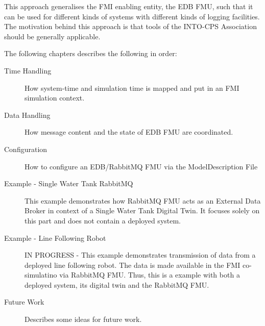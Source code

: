 This approach generalises the FMI enabling entity, the EDB FMU, such that
it can be used for different kinds of systems with different kinds of logging
facilities. The motivation behind this approach is that tools of the INTO-CPS Association
should be generally applicable.

The following chapters describes the following in order:
\begin{description}
  \item[Time Handling] How system-time and simulation time is mapped and put in
    an FMI simulation context.
  \item[Data Handling] How message content and the state of EDB FMU are
    coordinated.
  \item[Configuration] How to configure an EDB/RabbitMQ FMU via the ModelDescription File
  \item[Example - Single Water Tank RabbitMQ] This example demonstrates how RabbitMQ FMU
    acts as an External Data Broker in context of a Single Water Tank Digital Twin. It focuses solely on this part and does not
    contain a deployed system.

    \item[Example - Line Following Robot] IN PROGRESS - This example demonstrates transmission
    of data from a deployed line following robot. The data is made available in
    the FMI co-simulatino via RabbitMQ FMU. Thus, this is a example with
    both a deployed system, its digital twin and the RabbitMQ FMU.
  \item[Future Work] Describes some ideas for future work.
\end{description}


